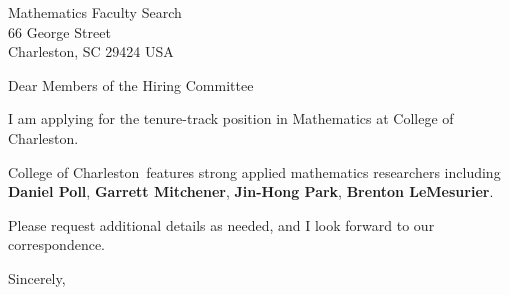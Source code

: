 




	
	
	\def\School{College of Charleston}
	
	\begin{letter}
		{Mathematics Faculty Search\\
			66 George Street\\
			Charleston, SC 29424 USA
			
		}
		
		\opening{Dear Members of the Hiring Committee}
		
		
		I am applying for the tenure-track position in Mathematics at \School. 
		
		
		
		\School~features strong applied mathematics researchers including \textbf{Daniel Poll}, \textbf{Garrett Mitchener}, \textbf{Jin-Hong Park}, \textbf{Brenton LeMesurier}. 
		
		
		
		
		
		Please request additional details as needed, and I look forward to our correspondence.
		
		\closing{Sincerely,}
	\end{letter}
